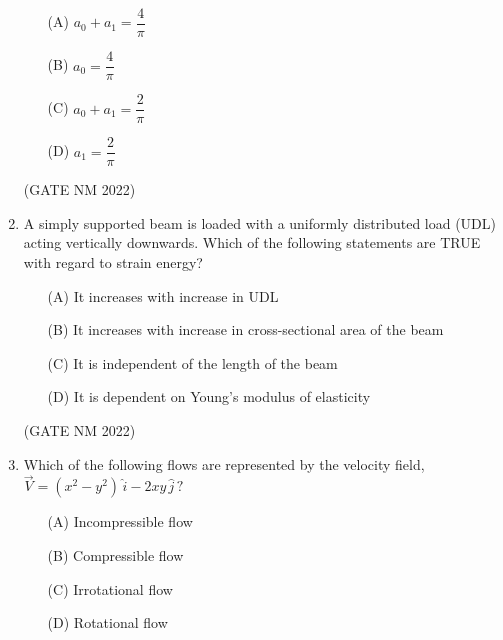 \documentclass[journal,12pt,onecolumn]{IEEEtran}
\theoremstyle{remark}
\begin{document}
\begin{enumerate}
\begin{multicols}{4}

\begin{enumerate}
	\item [(A)] $a_0 + a_1 = \dfrac{4}{\pi}$
	\item  [(B)] $a_0 = \dfrac{4}{\pi}$
	\item [(C)]  $a_0 + a_1 = \dfrac{2}{\pi}$
	\item  [(D)] $a_1 = \dfrac{2}{\pi}$
\end{enumerate}

\end{multicols}

\hfill(GATE NM 2022)





\item  A simply supported beam is loaded with a uniformly distributed load (UDL) acting vertically downwards. Which of the following statements are TRUE with regard to strain energy?

\begin{enumerate}
	\item  [(A)] It increases with increase in UDL
	\item  [(B)] It increases with increase in cross-sectional area of the beam
	\item  [(C)] It is independent of the length of the beam
	\item  [(D)] It is dependent on Young's modulus of elasticity
\end{enumerate}

\hfill(GATE NM 2022)







\item  Which of the following flows are represented by the velocity field,  
$
\vec{V} = (x^2 - y^2)\,\hat{i} - 2xy\,\hat{j} \, ?
$

\begin{multicols}{2}

\begin{enumerate}
    \item[(A)] Incompressible flow
    \item[(B)] Compressible flow
    \item[(C)] Irrotational flow
    \item[(D)] Rotational flow
\end{enumerate}

\end{multicols}


\end{enumerate}
\end{document}

